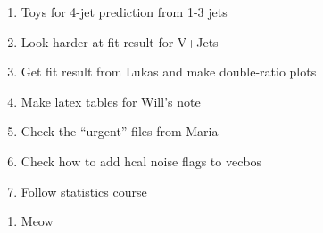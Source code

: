 

\begin{enumerate}
\item Toys for 4-jet prediction from 1-3 jets
\item Look harder at fit result for V+Jets
\item Get fit result from Lukas and make double-ratio plots
\item Make latex tables for Will's note
\item Check the ``urgent'' files from Maria
\item Check how to add hcal noise flags to vecbos
\item Follow statistics course
\end{enumerate}


\begin{enumerate}
\item Meow~
\end{enumerate}


